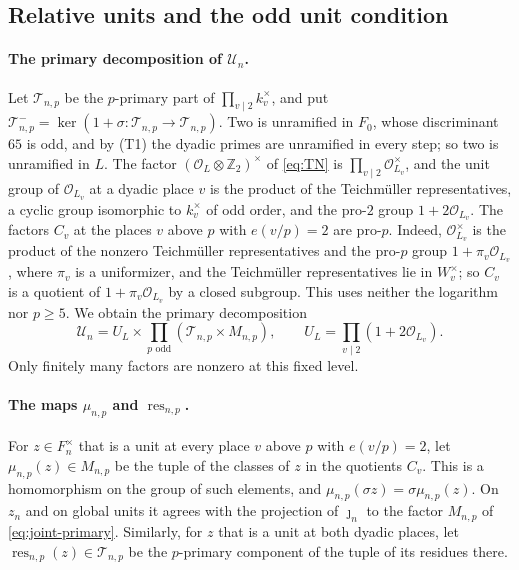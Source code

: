 \documentclass[11pt]{article}
\theoremstyle{plain}
\theoremstyle{definition}
\theoremstyle{remark}
\newcommand{\Z}{\mathbb Z}
\newcommand{\OO}{\mathcal O}
\begin{document}
\subsection{Relative units and the odd unit condition}\label{sec:odd-condition}
\paragraph{The primary decomposition of $\mathcal U_n$.}  Let
$\mathcal T_{n,p}$ be the $p$-primary part of $\prod_{v\mid2}k_v^\times$,
and put
$\mathcal T_{n,p}^-=\ker(1+\sigma:\mathcal T_{n,p}\to\mathcal T_{n,p})$.
Two is unramified in $F_0$, whose discriminant $65$ is odd, and by
\textup{(T1)} the dyadic primes are unramified in every step; so two is
unramified in $L$.  The factor $(\OO_L\otimes\Z_2)^\times$ of
\eqref{eq:TN} is $\prod_{v\mid2}\OO_{L_v}^\times$, and the unit group of
$\OO_{L_v}$ at a dyadic place $v$ is the product of the Teichm\"uller
representatives, a cyclic group isomorphic to $k_v^\times$ of odd order,
and the pro-$2$ group $1+2\OO_{L_v}$.  The factors $C_v$ at the places $v$
above $p$ with $e(v/p)=2$ are pro-$p$.  Indeed, $\OO_{L_v}^\times$ is the
product of the nonzero Teichm\"uller representatives and the pro-$p$ group
$1+\pi_v\OO_{L_v}$, where $\pi_v$ is a uniformizer, and the Teichm\"uller
representatives lie in $W_v^\times$; so $C_v$ is a quotient of
$1+\pi_v\OO_{L_v}$ by a closed subgroup.  This uses neither the logarithm
nor $p\ge5$.  We obtain the primary decomposition
\begin{equation}\label{eq:joint-primary}
 \mathcal U_n=U_L\times\prod_{p\text{ odd}}(\mathcal T_{n,p}\times M_{n,p}),
 \qquad U_L=\prod_{v\mid2}(1+2\OO_{L_v}).
\end{equation}
Only finitely many factors are nonzero at this fixed level.

\paragraph{The maps $\mu_{n,p}$ and $\operatorname{res}_{n,p}$.}  For
$z\in F_n^\times$ that is a unit at every place $v$ above $p$ with
$e(v/p)=2$, let $\mu_{n,p}(z)\in M_{n,p}$ be the tuple of the classes of $z$ in
the quotients $C_v$.  This is a homomorphism on the group of such
elements, and $\mu_{n,p}(\sigma z)=\sigma\mu_{n,p}(z)$.  On $z_n$ and on
global units it agrees with the projection of $\jmath_n$ to the factor
$M_{n,p}$ of \eqref{eq:joint-primary}.  Similarly, for $z$ that is a unit
at both dyadic places, let $\operatorname{res}_{n,p}(z)\in\mathcal T_{n,p}$
be the $p$-primary component of the tuple of its residues there.
\end{document}
